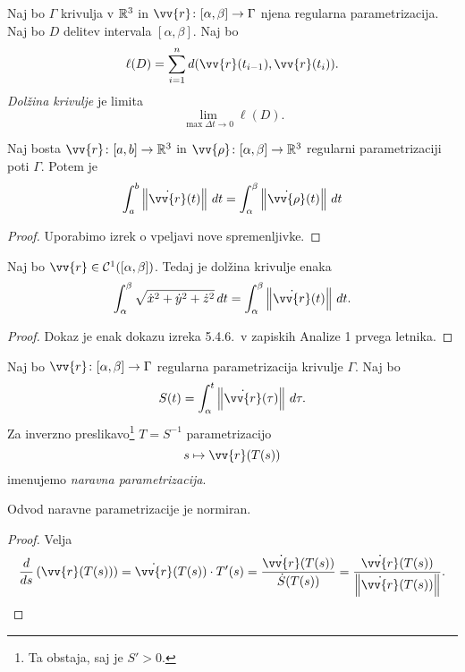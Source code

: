 \begin{definicija}
Naj bo $\Gamma$ krivulja v $\mathbb{R}^3$ in
$\vv{r} \colon [\alpha, \beta] \to \Gamma$ njena regularna
parametrizacija. Naj bo $D$ delitev intervala $[\alpha, \beta]$.
Naj bo
\[
\ell(D) =
\sum_{i=1}^n d(\vv{r}(t_{i-1}),\vv{r}(t_i)).
\]
\emph{Dolžina krivulje} je limita
\[
\lim_{\max \Delta t \to 0} \ell(D).
\]
\end{definicija}

\begin{trditev}
Naj bosta $\vv{r}\colon[a,b]\to\R^3$ in
$\vv{\rho}\colon[\alpha,\beta]\to\R^3$ regularni parametrizaciji
poti $\Gamma$. Potem je
\[
\int_a^b \norm{\dot{\vv{r}}(t)}\,dt =
\int_\alpha^\beta \norm{\dot{\vv{\rho}}(t)}\,dt
\]
\end{trditev}

\begin{proof}
Uporabimo izrek o vpeljavi nove spremenljivke.
\end{proof}

\begin{trditev}
Naj bo $\vv{r} \in \mathcal{C}^1([\alpha, \beta])$. Tedaj je
dolžina krivulje enaka
\[
\int_\alpha^\beta \sqrt{\dot{x}^2 + \dot{y}^2 + \dot{z}^2}\,dt =
\int_\alpha^\beta \norm{\dot{\vv{r}}(t)}\,dt.
\]
\end{trditev}

\begin{proof}
Dokaz je enak dokazu izreka 5.4.6.\ v zapiskih Analize 1 prvega
letnika.
\end{proof}

\begin{definicija}
Naj bo $\vv{r} \colon [\alpha, \beta] \to \Gamma$ regularna
parametrizacija krivulje $\Gamma$. Naj bo
\[
S(t) = \int_\alpha^t \norm{\dot{\vv{r}}(\tau)}\,d\tau.
\]
Za inverzno preslikavo\footnote{Ta obstaja, saj je $S' > 0$.}
$T=S^{-1}$ parametrizacijo
\[
s \mapsto \vv{r}(T(s))
\]
imenujemo
\emph{naravna parametrizacija}.
\end{definicija}

\begin{trditev}
Odvod naravne parametrizacije je normiran.
\end{trditev}

\begin{proof}
Velja
\[
\frac{d}{ds} \left(\vv{r}(T(s))\right) =
\dot{\vv{r}}(T(s)) \cdot T'(s) =
\frac{\dot{\vv{r}}(T(s))}{\dot{S}(T(s))} =
\frac{\dot{\vv{r}}(T(s))}{\norm{\dot{\vv{r}}(T(s))}}. \qedhere
\]
\end{proof}

